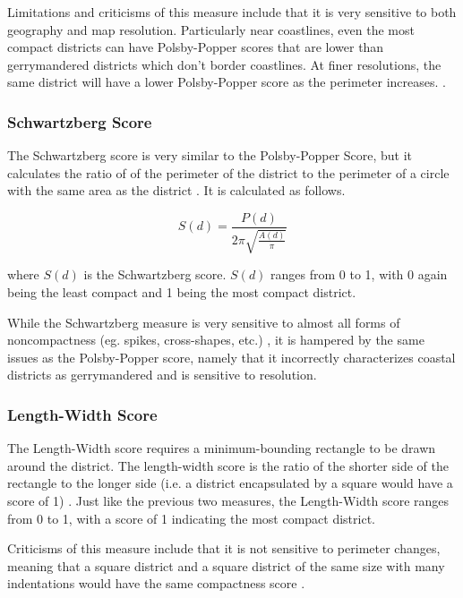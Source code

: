 Limitations and criticisms of this measure include that it is very sensitive to both geography and map resolution. Particularly near coastlines, even the most compact districts can have Polsby-Popper scores that are lower than gerrymandered districts which don't border coastlines. At finer resolutions, the same district will have a lower Polsby-Popper score as the perimeter increases. \parencite[12]{mccartan2020}.

\subsubsection{Schwartzberg Score}

The Schwartzberg score is very similar to the Polsby-Popper Score, but it calculates the ratio of of the perimeter of the district to the perimeter of a circle with the same area as the district \parencite{schwartzberg1966}. It is calculated as follows. 

\begin{equation}
    S(d) = \frac{P(d)}{2 \pi \sqrt{\frac{A(d)}{\pi}}}
\end{equation}

where $S(d)$ is the Schwartzberg score. $S(d)$ ranges from 0 to 1, with 0 again being the least compact and 1 being the most compact district. 

While the Schwartzberg measure is very sensitive to almost all forms of noncompactness (eg. spikes, cross-shapes, etc.) \parencite[301]{polsby1991}, it is hampered by the same issues as the Polsby-Popper score, namely that it incorrectly characterizes coastal districts as gerrymandered and is sensitive to resolution. 

\subsubsection{Length-Width Score}

The Length-Width score requires a minimum-bounding rectangle to be drawn around the district. The length-width score is the ratio of the shorter side of the rectangle to the longer side (i.e. a district encapsulated by a square would have a score of 1) \parencite{harris1964}. Just like the previous two measures, the Length-Width score ranges from 0 to 1, with a score of 1 indicating the most compact district. 

Criticisms of this measure include that it is not sensitive to perimeter changes, meaning that a square district and a square district of the same size with many indentations would have the same compactness score \parencite{polsby1991}.

